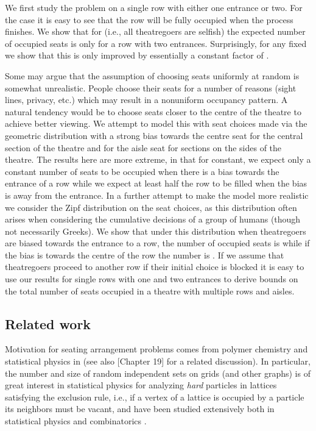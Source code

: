 \documentclass[11pt]{llncs}
\begin{document}
We first study the problem on
a single row with either one entrance or two.
For the case  it is easy to see that the row will be fully occupied when
the process finishes. We show that for  (i.e., all theatregoers are selfish)
the expected number of occupied seats is only  
for a row with
two entrances. Surprisingly, for any fixed  we show that this is only 
improved by essentially a constant factor of . 

Some may
argue that the assumption of choosing seats uniformly at random is somewhat
unrealistic. People choose their seats for a number of reasons (sight lines, privacy, etc.)
which may  result in a nonuniform occupancy pattern. A natural tendency would be to 
choose seats closer to the centre of the theatre to achieve better viewing. We
attempt to model this with seat choices made via the geometric distribution
with a strong bias towards the centre seat for the central section of the theatre
and for the aisle seat for sections on the sides of the theatre. The results
here are more extreme, in that for  constant, we expect only a constant number
of seats to be occupied when there is a bias towards the entrance of a row while we expect
at least half the row to be filled when the bias is away from the entrance.
In a further
attempt to make the model more realistic we consider  the Zipf distribution on the seat choices, as this 
distribution often arises when considering the cumulative decisions of a
group of humans (though not necessarily Greeks)\cite{zipf}. We show that under this distribution
when theatregoers
are biased towards the entrance to a row, the number of occupied seats is
 while if the bias is towards the centre of the row the number
is .
If we assume that theatregoers proceed to another row if their initial choice
is blocked it is easy to
use our results for single rows with one and two entrances to derive bounds
on the total number of seats occupied in a theatre with multiple rows and aisles. 


\subsection{Related work}

Motivation for seating arrangement problems
comes from polymer chemistry and statistical physics in
\cite{flory1939intramolecular,olson1978markov} (see also \cite{strogatz2012joy}[Chapter 19]
for a related discussion).
In particular, the number and size of random independent sets 
on grids (and other graphs) is of great interest in
statistical physics for analyzing {\it hard} particles in lattices
satisfying the exclusion rule, i.e., if a vertex of a lattice is 
occupied by a particle its neighbors must be vacant, and 
have been studied
extensively both in statistical physics and combinatorics 
\cite{baxter,hard1,hard2,calkin-wilf,finch}.
\end{document}
